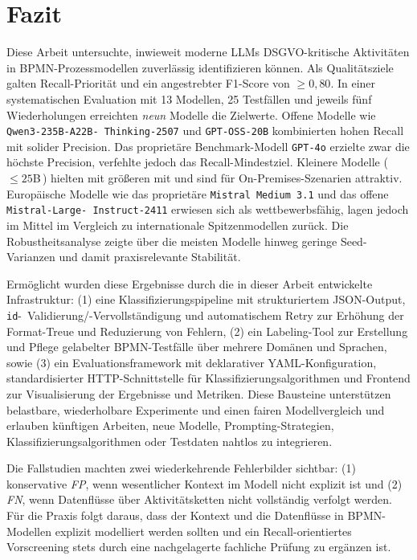 \chapter{Fazit}\label{ch:fazit}

Diese Arbeit untersuchte, inwieweit moderne \acp{LLM} \ac{DSGVO}-kritische Aktivitäten in \ac{BPMN}-Prozessmodellen zuverlässig identifizieren können. Als Qualitätsziele galten Recall-Priorität und ein angestrebter F1-Score von $\geq 0{,}80$. In einer systematischen Evaluation mit 13 Modellen, 25 Testfällen und jeweils fünf Wiederholungen erreichten \emph{neun} Modelle die Zielwerte. Offene Modelle wie \texttt{Qwen3-235B-A22B-\linebreak~Thinking-2507} und \texttt{GPT-OSS-20B} kombinierten hohen Recall mit solider Precision. Das proprietäre Benchmark-Modell \texttt{GPT-4o} erzielte zwar die höchste Precision, verfehlte jedoch das Recall-Mindestziel. Kleinere Modelle (\,$\leq 25$B\,) hielten mit größeren mit und sind für On-Premises-Szenarien attraktiv. Europäische Modelle wie das proprietäre \texttt{Mistral Medium 3.1} und das offene \texttt{Mistral-Large-\linebreak~Instruct-2411} erwiesen sich als wettbewerbsfähig, lagen jedoch im Mittel im Vergleich zu internationale Spitzenmodellen zurück. Die Robustheitsanalyse zeigte über die meisten Modelle hinweg geringe Seed-Varianzen und damit praxisrelevante Stabilität.

Ermöglicht wurden diese Ergebnisse durch die in dieser Arbeit entwickelte Infrastruktur: (1) eine Klassifizierungspipeline mit strukturiertem JSON-Output, \texttt{id}-\linebreak~Validierung/-Vervollständigung und automatischem Retry zur Erhöhung der Format-Treue und Reduzierung von Fehlern, (2) ein Labeling-Tool zur Erstellung und Pflege gelabelter \ac{BPMN}-Testfälle über mehrere Domänen und Sprachen, sowie (3) ein Evaluationsframework mit deklarativer YAML-Konfiguration, standardisierter HTTP-Schnittstelle für Klassifizierungsalgorithmen und Frontend zur Visualisierung der Ergebnisse und Metriken. Diese Bausteine unterstützen belastbare, wiederholbare Experimente und einen fairen Modellvergleich und erlauben künftigen Arbeiten, neue Modelle, Prompting-Strategien, Klassifizierungsalgorithmen oder Testdaten nahtlos zu integrieren.

Die Fallstudien machten zwei wiederkehrende Fehlerbilder sichtbar: (1) konservative \emph{FP}, wenn wesentlicher Kontext im Modell nicht explizit ist und (2) \emph{FN}, wenn Datenflüsse über Aktivitätsketten nicht vollständig verfolgt werden. Für die Praxis folgt daraus, dass der Kontext und die Datenflüsse in \ac{BPMN}-Modellen explizit modelliert werden sollten und ein Recall-orientiertes Vorscreening stets durch eine nachgelagerte fachliche Prüfung zu ergänzen ist.

